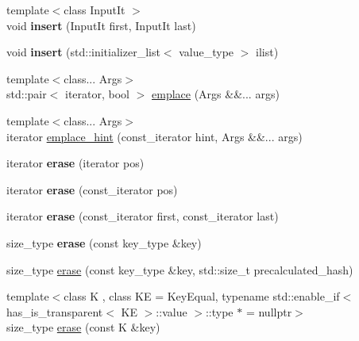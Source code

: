 \begin{DoxyCompactItemize}
\mbox{\label{classtsl_1_1robin__set_ae7db741c23f1f3e1ee50ea22115216c5}} 
{\footnotesize template$<$class Input\+It $>$ }\\void {\bfseries insert} (Input\+It first, Input\+It last)
\item 
\mbox{\label{classtsl_1_1robin__set_ad3606f2531057986a11227dffda103cf}} 
void {\bfseries insert} (std\+::initializer\+\_\+list$<$ value\+\_\+type $>$ ilist)
\item 
{\footnotesize template$<$class... Args$>$ }\\std\+::pair$<$ iterator, bool $>$ \mbox{\hyperlink{classtsl_1_1robin__set_a350aac536c0c747908707788035f2d92}{emplace}} (Args \&\&... args)
\item 
{\footnotesize template$<$class... Args$>$ }\\iterator \mbox{\hyperlink{classtsl_1_1robin__set_abc4f08f83e5d7793a1fc9360575788cf}{emplace\+\_\+hint}} (const\+\_\+iterator hint, Args \&\&... args)
\item 
\mbox{\label{classtsl_1_1robin__set_a13526fc19edf624c6d347f8375b4af5c}} 
iterator {\bfseries erase} (iterator pos)
\item 
\mbox{\label{classtsl_1_1robin__set_a92ea2d1690af39eaea093d166a654a82}} 
iterator {\bfseries erase} (const\+\_\+iterator pos)
\item 
\mbox{\label{classtsl_1_1robin__set_a2a32f993c7dc282585836ac88aa479c2}} 
iterator {\bfseries erase} (const\+\_\+iterator first, const\+\_\+iterator last)
\item 
\mbox{\label{classtsl_1_1robin__set_a662db65973b6628b59130592c38187d4}} 
size\+\_\+type {\bfseries erase} (const key\+\_\+type \&key)
\item 
size\+\_\+type \mbox{\hyperlink{classtsl_1_1robin__set_a4d81adc873ab3959505e93a462b541c9}{erase}} (const key\+\_\+type \&key, std\+::size\+\_\+t precalculated\+\_\+hash)
\item 
{\footnotesize template$<$class K , class KE  = Key\+Equal, typename std\+::enable\+\_\+if$<$ has\+\_\+is\+\_\+transparent$<$ K\+E $>$\+::value $>$\+::type $\ast$  = nullptr$>$ }\\size\+\_\+type \mbox{\hyperlink{classtsl_1_1robin__set_a73ab9452fa9af3e897603dcb8df86648}{erase}} (const K \&key)

\end{DoxyCompactItemize}
